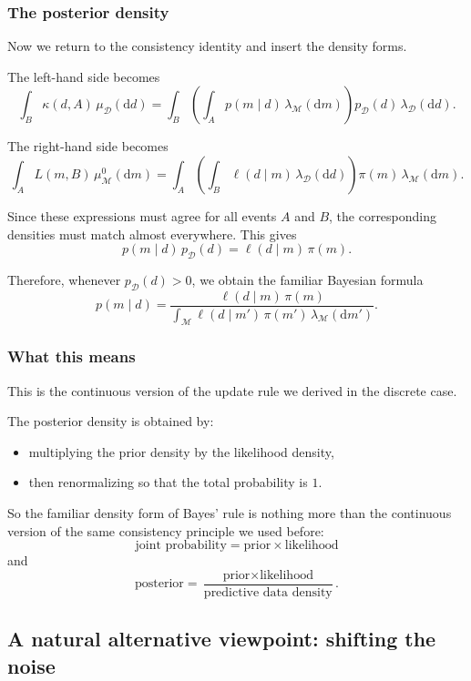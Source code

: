 \documentclass[11pt]{article}
\theoremstyle{remark}
\newcommand{\modelspace}{\mathcal{M}}
\newcommand{\dataspace}{\mathcal{D}}
\begin{document}
\subsubsection{The posterior density}

Now we return to the consistency identity and insert the density forms.

The left-hand side becomes
\[
\int_B \kappa(d,A)\,\mu_{\dataspace}(\mathrm dd)
=
\int_B \left(\int_A p(m\mid d)\,\lambda_{\modelspace}(\mathrm dm)\right)
p_{\dataspace}(d)\,\lambda_{\dataspace}(\mathrm dd).
\]

The right-hand side becomes
\[
\int_A L(m,B)\,\mu_{\modelspace}^0(\mathrm dm)
=
\int_A \left(\int_B \ell(d\mid m)\,\lambda_{\dataspace}(\mathrm dd)\right)
\pi(m)\,\lambda_{\modelspace}(\mathrm dm).
\]

Since these expressions must agree for all events \(A\) and \(B\), the corresponding densities must match almost everywhere. This gives
\[
p(m\mid d)\,p_{\dataspace}(d)
=
\ell(d\mid m)\,\pi(m).
\]

Therefore, whenever \(p_{\dataspace}(d)>0\), we obtain the familiar Bayesian formula
\[
p(m\mid d)
=
\frac{\ell(d\mid m)\,\pi(m)}
{\displaystyle \int_{\modelspace} \ell(d\mid m')\,\pi(m')\,\lambda_{\modelspace}(\mathrm dm')}.
\]

\vspace{2mm}

\subsubsection{What this means}

This is the continuous version of the update rule we derived in the discrete case.

The posterior density is obtained by:
\begin{itemize}
    \item multiplying the prior density by the likelihood density,
    \item then renormalizing so that the total probability is \(1\).
\end{itemize}

So the familiar density form of Bayes' rule is nothing more than the continuous version of the same consistency principle we used before:
\[
\text{joint probability} = \text{prior} \times \text{likelihood}
\]
and
\[
\text{posterior} = \frac{\text{prior} \times \text{likelihood}}{\text{predictive data density}}.
\]


\subsection{A natural alternative viewpoint: shifting the noise}
\end{document}
